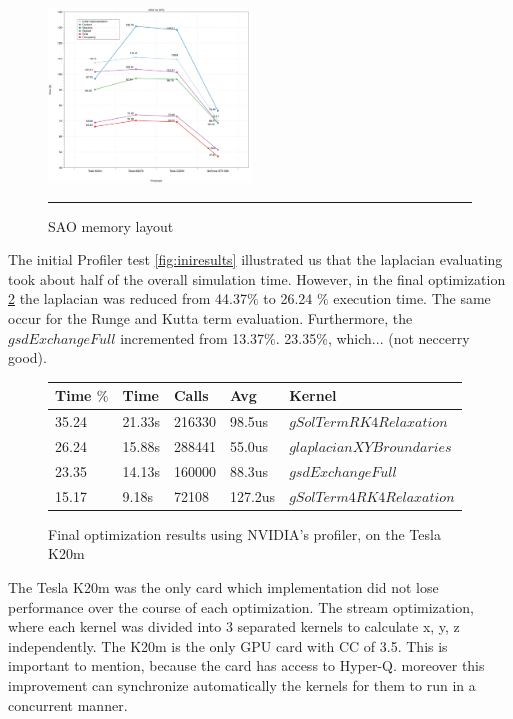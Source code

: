 \begin{figure}[htbp]
	\centering
		\includegraphics[width=0.48\textwidth]{Figures/gpuOptimization.png}
		\rule{35em}{0.2pt}
	\caption[Structure of Arrays (SAO)]{SAO memory layout}
	\label{fig:sao}
\end{figure}

The initial Profiler test \ref{fig:iniresults} illustrated us that the laplacian evaluating took about half of the overall simulation time. However, in the final optimization \ref{fig:final} the laplacian was reduced from 44.37$\%$ to 26.24 $\%$ execution time. The same occur for the Runge and Kutta term evaluation. Furthermore, the $gsdExchangeFull$ incremented from 13.37$\%$. 23.35$\%$, which... (not neccerry good).

\begin{figure}[htbp]
	\centering
	  \begin{tabular} { |  l  |  l | l  | l | l |}
	      \hline
	    Time $\%$& Time & Calls & Avg & Kernel \\
    \hline
   35.24 & 21.33s & 216330 & 98.5us & $gSolTermRK4Relaxation$ \\
   \hline
   26.24 & 15.88s & 288441 & 55.0us & $glaplacianXYBroundaries$\\
   \hline
   23.35 & 14.13s & 160000 & 88.3us & $gsdExchangeFull$ \\
   \hline
   15.17 & 9.18s & 72108 & 127.2us & $gSolTerm4RK4Relaxation$\\ 
   \hline
    \end{tabular}
	\caption[Optimization results with the Profiler]{Final optimization results using NVIDIA's profiler, on the Tesla K20m}
	\label{fig:final}
\end{figure}
    
The Tesla K20m was the only card which implementation did not lose performance over the course of each optimization. The stream optimization, where each kernel was divided into 3 separated kernels to calculate x, y, z independently. The K20m is the only GPU card with CC of 3.5. This is important to mention, because the card has access to Hyper-Q. moreover this improvement can synchronize automatically the kernels for them to run in a concurrent manner. 

